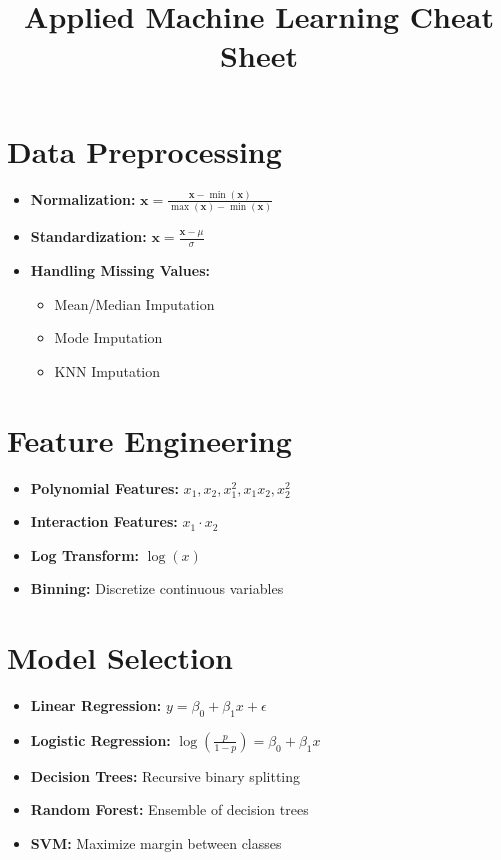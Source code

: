 \documentclass[a4paper,10pt]{article}
\title{Applied Machine Learning Cheat Sheet}
\author{}
\date{}
\begin{document}
\maketitle

\begin{multicols}{3}
\section*{Data Preprocessing}
\begin{itemize}
    \item \textbf{Normalization:} $\mathbf{x} = \frac{\mathbf{x} - \min(\mathbf{x})}{\max(\mathbf{x}) - \min(\mathbf{x})}$
    \item \textbf{Standardization:} $\mathbf{x} = \frac{\mathbf{x} - \mu}{\sigma}$
    \item \textbf{Handling Missing Values:}
    \begin{itemize}
        \item Mean/Median Imputation
        \item Mode Imputation
        \item KNN Imputation
    \end{itemize}
\end{itemize}

\section*{Feature Engineering}
\begin{itemize}
    \item \textbf{Polynomial Features:} $x_1, x_2, x_1^2, x_1x_2, x_2^2$
    \item \textbf{Interaction Features:} $x_1 \cdot x_2$
    \item \textbf{Log Transform:} $\log(x)$
    \item \textbf{Binning:} Discretize continuous variables
\end{itemize}

\section*{Model Selection}
\begin{itemize}
    \item \textbf{Linear Regression:} $y = \beta_0 + \beta_1 x + \epsilon$
    \item \textbf{Logistic Regression:} $\log\left(\frac{p}{1-p}\right) = \beta_0 + \beta_1 x$
    \item \textbf{Decision Trees:} Recursive binary splitting
    \item \textbf{Random Forest:} Ensemble of decision trees
    \item \textbf{SVM:} Maximize margin between classes
\end{itemize}


\end{multicols}
\end{document}

